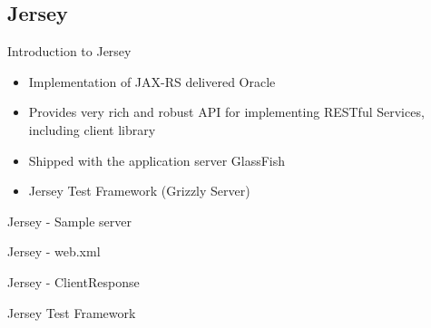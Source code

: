 \subsection{Jersey}
	\begin{frame}{Introduction to Jersey}
		\begin{itemize}
		  \item Implementation of JAX-RS delivered Oracle
		  \item Provides very rich and robust API for implementing RESTful Services, including client library
		  \item Shipped with the application server GlassFish
		  \item Jersey Test Framework (Grizzly Server)
		\end{itemize}
	\end{frame}
 
\begin{frame}{Jersey - Sample server}
	  
\end{frame} 

\begin{frame}{Jersey - web.xml}
	   
\end{frame}

\begin{frame}{Jersey - ClientResponse}
	
\end{frame}

\begin{frame}{Jersey Test Framework}
	
\end{frame}
  
